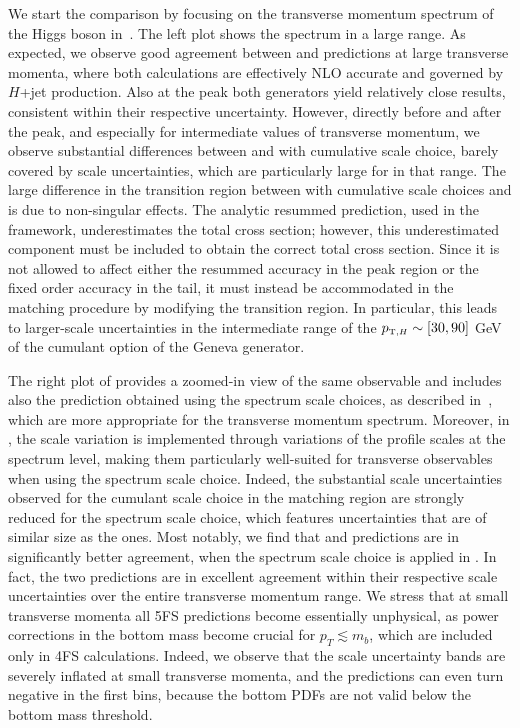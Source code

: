 \documentclass[11pt,a4paper]{article}
\begin{document}
We start the comparison by focusing on the transverse momentum spectrum of the Higgs boson in~. The left plot shows the spectrum in a large range. As 
expected, we observe good agreement between \minnlo{} and \GENEVA{} predictions
at large transverse momenta, where both calculations are effectively NLO accurate and 
governed by $H$+jet production. Also at the peak both generators yield relatively 
close results, consistent within their respective uncertainty. However, directly
before and after the peak, and especially for intermediate values of 
transverse momentum, we observe substantial differences between \minnlo{} and \GENEVA{} with cumulative scale choice, barely covered by scale uncertainties,
which are particularly large for \GENEVA{} in that range. The large difference in the transition region between \GENEVA{} with cumulative scale choices and \minnlo{} is due to non-singular effects. The analytic resummed prediction, used in the \GENEVA{} framework, underestimates the total cross section; however, this underestimated component must be included to obtain the correct total cross section. Since it is not allowed to affect either the resummed accuracy in the peak region or the fixed order accuracy in the tail, it must instead be accommodated in the matching procedure by modifying the transition region. In particular, this leads to larger-scale uncertainties in the intermediate range of the $\ptH\sim[30,90]$ GeV of the cumulant option of the Geneva generator.

The right plot of  provides a zoomed-in view of the same observable and includes also the \GENEVA{} prediction obtained using the spectrum scale choices, as described in~, which are more appropriate for the transverse momentum spectrum. 
Moreover, in \GENEVA{}, the scale variation is implemented through variations of the profile scales at the spectrum level, making them particularly well-suited for transverse observables when using the spectrum scale choice. Indeed, the substantial 
scale uncertainties observed for the cumulant scale choice
in the matching region are strongly reduced for the spectrum scale choice, which 
features uncertainties that are of similar size as the \minnlo{} ones.
Most notably, we find that \minnlo{} and \GENEVA{} predictions are in significantly 
better agreement, when the spectrum scale choice is applied in \GENEVA{}.
In fact, the two predictions are in excellent agreement within their respective scale
uncertainties over the entire transverse momentum range.
We stress that at small transverse momenta all 5FS predictions
become essentially unphysical, as power corrections in the 
bottom mass become crucial for $p_T\lesssim m_b$, which are included only 
in 4FS calculations. Indeed, we observe that the scale uncertainty bands are
severely inflated at small transverse momenta, and the predictions can
even turn negative in the first bins, because the bottom PDFs are not valid below
the bottom mass threshold.
\end{document}
